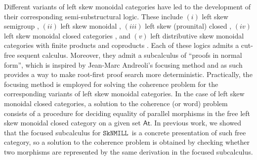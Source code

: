 \documentclass[sn-mathphys-num]{sn-jnl}%
\newcommand{\SkNMILL}{$\mathtt{SkNMILL}$}
\theoremstyle{thmstyleone}%
\theoremstyle{thmstyletwo}%
\theoremstyle{thmstylethree}%
\begin{document}
Different variants of left skew monoidal categories have led to the development of their corresponding semi-substructural logic.
These include $(i)$ left skew semigroup \cite{zeilberger:semiassociative:19}, $(ii)$ left skew monoidal \cite{uustalu:sequent:2021}, $(iii)$ left skew (prounital) closed \cite{uustalu:deductive:nodate}, $(iv)$ left skew monoidal closed categories \cite{UVW:protsn,veltri:multifocus:23,wan2024}, and $(v)$ left distributive skew monoidal categories with finite products and coproducts \cite{VW:2023}.
Each of these logics admits a cut-free sequent calculus. Moreover, they admit a subcalculus of ``proofs in normal form'', which is inspired by Jean-Marc Andreoli's focusing method \cite{andreoli:logic:1992} and as such provides a way to make root-first proof search more deterministic.
Practically, the focusing method is employed for solving the coherence problem for the corresponding variants of left skew monoidal categories. In the case of left skew monoidal closed categories, a solution to the coherence (or word) problem consists of a procedure for deciding equality of parallel morphisms in the free left skew monoidal closed category on a given set $\mathsf{At}$.
In previous work, we showed that the focused subcalculus for \SkNMILL\ is a concrete presentation of such free category, so a solution to the coherence problem is obtained by checking whether two morphisms are represented by the same derivation in the focused subcalculus.
\end{document}

